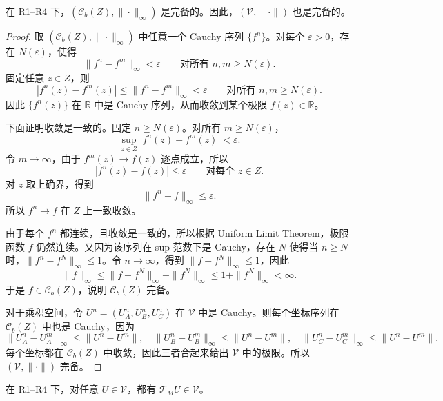 \begin{lemma}
在 R1--R4 下，$(\mathcal C_b(Z),\|\cdot\|_\infty)$ 是完备的。因此，$(\mathcal V,\|\cdot\|)$ 也是完备的。
\end{lemma}

\begin{proof}
取 $(\mathcal C_b(Z),\|\cdot\|_\infty)$ 中任意一个 Cauchy 序列 $\{f^n\}$。对每个 $\varepsilon>0$，存在 $N(\varepsilon)$，使得
\[
\|f^n-f^m\|_\infty<\varepsilon
\qquad\text{对所有 }n,m\ge N(\varepsilon).
\]
固定任意 $z\in Z$，则
\[
|f^n(z)-f^m(z)|\le \|f^n-f^m\|_\infty<\varepsilon
\qquad\text{对所有 }n,m\ge N(\varepsilon).
\]
因此 $\{f^n(z)\}$ 在 $\mathbb R$ 中是 Cauchy 序列，从而收敛到某个极限 $f(z)\in\mathbb R$。

下面证明收敛是一致的。固定 $n\ge N(\varepsilon)$。对所有 $m\ge N(\varepsilon)$，
\[
\sup_{z\in Z}|f^n(z)-f^m(z)|<\varepsilon.
\]
令 $m\to\infty$，由于 $f^m(z)\to f(z)$ 逐点成立，所以
\[
|f^n(z)-f(z)|\le \varepsilon
\qquad\text{对每个 }z\in Z.
\]
对 $z$ 取上确界，得到
\[
\|f^n-f\|_\infty\le \varepsilon.
\]
所以 $f^n\to f$ 在 $Z$ 上一致收敛。

由于每个 $f^n$ 都连续，且收敛是一致的，所以根据 Uniform Limit Theorem，极限函数 $f$ 仍然连续。又因为该序列在 sup 范数下是 Cauchy，存在 $N$ 使得当 $n\ge N$ 时，$\|f^n-f^N\|_\infty\le 1$。令 $n\to\infty$，得到 $\|f-f^N\|_\infty\le 1$，因此
\[
\|f\|_\infty\le \|f-f^N\|_\infty+\|f^N\|_\infty\le 1+\|f^N\|_\infty<\infty.
\]
于是 $f\in\mathcal C_b(Z)$，说明 $\mathcal C_b(Z)$ 完备。

对于乘积空间，令 $U^n=(U_A^n,U_B^n,U_C^n)$ 在 $\mathcal V$ 中是 Cauchy。则每个坐标序列在 $\mathcal C_b(Z)$ 中也是 Cauchy，因为
\[
\|U_A^n-U_A^m\|_\infty\le \|U^n-U^m\|,
\quad
\|U_B^n-U_B^m\|_\infty\le \|U^n-U^m\|,
\quad
\|U_C^n-U_C^m\|_\infty\le \|U^n-U^m\|.
\]
每个坐标都在 $\mathcal C_b(Z)$ 中收敛，因此三者合起来给出 $\mathcal V$ 中的极限。所以 $(\mathcal V,\|\cdot\|)$ 完备。
\end{proof}

\begin{lemma}
在 R1--R4 下，对任意 $U\in\mathcal V$，都有 $\mathcal T_MU\in\mathcal V$。
\end{lemma}

